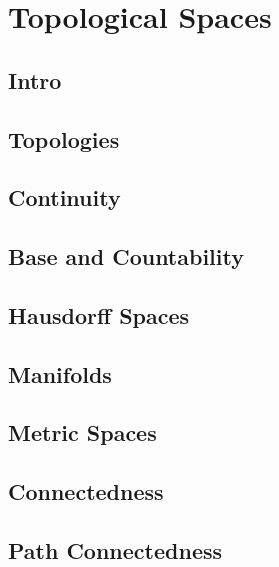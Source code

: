 

\section{Topological Spaces}
\label{section-topological-spaces}

\subsection{Intro}
\label{subsection-topological-spaces-intro}

\subsection{Topologies}
\label{subsection-topologies}

\subsection{Continuity}
\label{subsection-continuity}

\subsection{Base and Countability}
\label{subsection-base-and-countablity}

\subsection{Hausdorff Spaces}
\label{subsection-Hausdorff-spaces}

\subsection{Manifolds}
\label{subsection-manifolds}

\subsection{Metric Spaces}
\label{subsection-metric-spaces}

\subsection{Connectedness}
\label{subsection-connectedness}

\subsection{Path Connectedness}
\label{subsection-path-connectedness}

